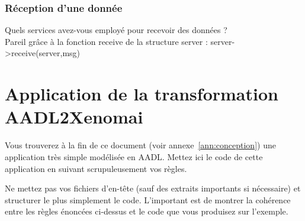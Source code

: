 \documentclass[11pt, a4paper]{paper}
\begin{document}
\subsubsection{Réception d’une donnée}
 {\color{blue} Quels services avez-vous employé pour recevoir des données ?}
\\Pareil grâce à la fonction receive de la structure server : server->receive(server,msg)

\section{Application de la transformation AADL2Xenomai}

{\color{blue} Vous trouverez à la fin de ce document (voir annexe~\ref{ann:conception}) une application très simple modélisée en AADL. Mettez ici le code de cette application en suivant scrupuleusement vos règles.

Ne mettez pas vos fichiers d'en-tête (sauf des extraits importants si nécessaire) et structurer le plus simplement le code. L'important est de montrer la cohérence entre les règles énoncées ci-dessus et le code que vous produisez sur l'exemple.}



\newpage
\appendix
\end{document}
